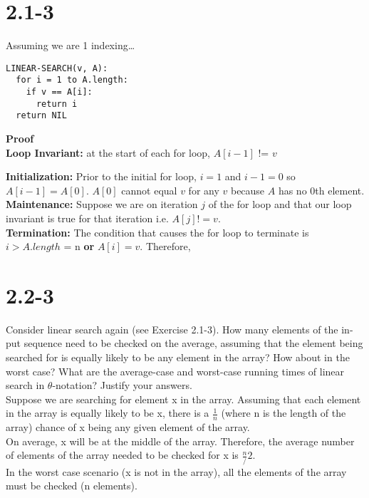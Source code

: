 \documentclass{article}
\begin{document}
\section{2.1-3}
Assuming we are 1 indexing\ldots
\begin{verbatim}
LINEAR-SEARCH(v, A):
  for i = 1 to A.length:
    if v == A[i]:
      return i
  return NIL
\end{verbatim}

\noindent
{\bfseries{\large Proof}}\\

\noindent
\textbf{Loop Invariant:} at the start of each for loop, $A[i-1]$ != $v$ \\
{\textbf{Initialization: } Prior to the initial for loop, $i = 1$ and $i - 1 = 0$
  so $A[i-1] = A[0]$. $A[0]$ cannot equal $v$ for any $v$ because $A$ has no 0th element.\\
\textbf{Maintenance: } Suppose we are on iteration $j$ of the for loop and that our loop
invariant is true for that iteration i.e. $A[j] != v$. \\
\textbf{Termination: } The condition that causes the for loop to terminate is
$i > A.length$ = n \textbf{or} $A[i] = v$. Therefore,

\section{2.2-3}
Consider linear search again (see Exercise 2.1-3). How many elements of the in-
put sequence need to be checked on the average, assuming that the element being
searched for is equally likely to be any element in the array? How about in the
worst case? What are the average-case and worst-case running times of linear
search in $\theta$-notation? Justify your answers. \\

\noindent
Suppose we are searching for element x in the array.
Assuming that each element in the array is equally likely to be x,
there is a $\frac{1}{n}$ (where n is the length of the array) chance
of x being any given element of the array. \\

\noindent
On average, x will be at the middle of the array.
Therefore, the average number of elements of the array needed to be
checked for x is $\frac{n}/{2}$. \\

\noindent
In the worst case scenario (x is not in the array), all the elements of
the array must be checked (n elements). \\

}
\end{document}
